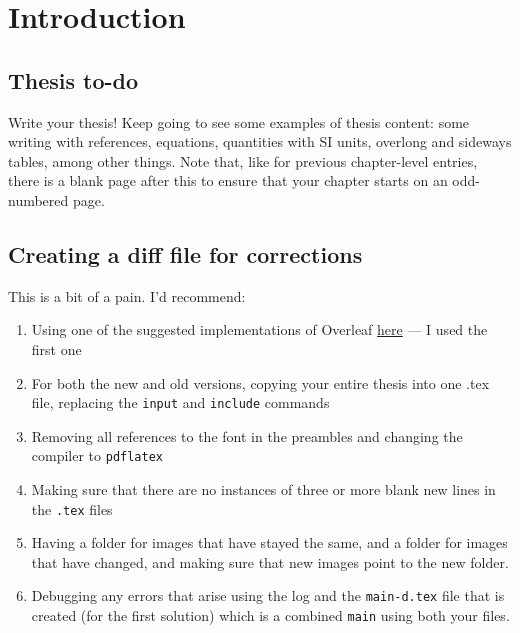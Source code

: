 \chapter[Introduction]{Introduction}%
\label{ch:introduction}

\section{Thesis to-do}

Write your thesis! Keep going to see some examples of thesis content: some writing with references, equations, quantities with SI units, overlong and sideways tables, among other things. Note that, like for previous chapter-level entries, there is a blank page after this to ensure that your chapter starts on an odd-numbered page.

\section{Creating a diff file for corrections}
This is a bit of a pain. I'd recommend:
\begin{enumerate}
    \item Using one of the suggested implementations of Overleaf \textcolor{blue}{\hyperlink{https://www.overleaf.com/learn/latex/Articles/How_to_use_latexdiff_on_Overleaf}{here}} --- I used the first one
    \item For both the new and old versions, copying your entire thesis into one .tex file, replacing the \texttt{input} and \texttt{include} commands
    \item Removing all references to the font in the preambles and changing the compiler to \texttt{pdflatex}
    \item Making sure that there are no instances of three or more blank new lines in the \texttt{.tex} files
    \item Having a folder for images that have stayed the same, and a folder for images that have changed, and making sure that new images point to the new folder.
    \item Debugging any errors that arise using the log and the \texttt{main-d.tex} file that is created (for the first solution) which is a combined \texttt{main} using both your files.
\end{enumerate}
